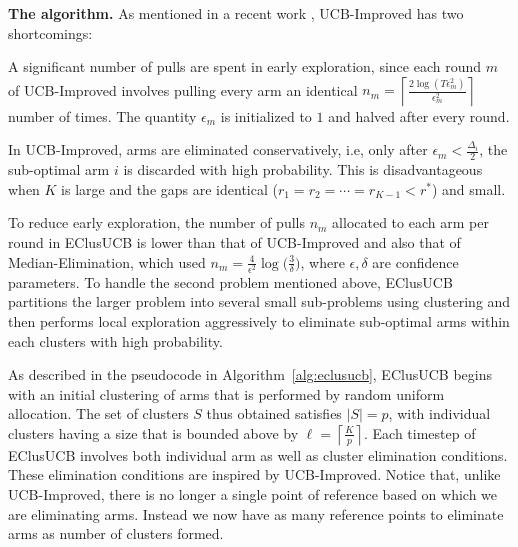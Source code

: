 \textbf{The algorithm.} As mentioned in a recent work \cite{liu2016modification}, UCB-Improved has two shortcomings: 	\\
\begin{inparaenum}[\bfseries(i)]
\item A significant number of pulls are spent in early exploration, since each round $m$ of UCB-Improved involves pulling every arm an identical $n_{m}=\left\lceil \frac{ 2\log(T\epsilon^{2}_{m})}{\epsilon^{2}_{m}} \right\rceil$ number of times. The quantity $\epsilon_{m}$ is initialized to $1$ and halved after every round.\\
\item In UCB-Improved, arms are eliminated conservatively, i.e, only after $\epsilon_{m}<\frac{\Delta_{i}}{2}$, the sub-optimal arm $i$ is discarded with high probability. This is disadvantageous when $K$ is large and the gaps are identical ($r_{1}=r_{2}=\cdots=r_{K-1}<r^{*}$) and small.\\
\end{inparaenum}
To reduce early exploration, the number of pulls $n_m$ allocated to each arm per round in EClusUCB is lower than that of UCB-Improved and also that of Median-Elimination, which used $n_m=\frac{4}{\epsilon^{2}}\log\big(\frac{3}{\delta}\big)$, where $\epsilon,\delta$ are confidence parameters.
To handle the second problem mentioned above, EClusUCB partitions the larger problem into several small sub-problems using clustering and then performs local exploration aggressively to eliminate sub-optimal arms within each clusters with high probability.

As described in the pseudocode in Algorithm~\ref{alg:eclusucb}, EClusUCB begins with an initial clustering of arms that is performed by random uniform allocation. The set of clusters $S$ thus obtained satisfies $|S|=p$, with individual clusters having a size that is bounded above by $\ell=\left\lceil \frac{K}{p} \right\rceil$.
Each timestep of EClusUCB involves both individual arm as well as cluster elimination conditions. These elimination conditions are inspired by UCB-Improved. Notice that, unlike UCB-Improved, there is no longer a single point of reference based on which we are eliminating arms. Instead we now have as many reference points to eliminate arms as number of clusters formed. 

